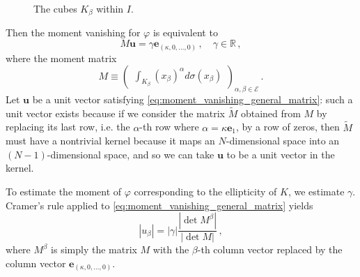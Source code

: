 \documentclass{amsart}%
\theoremstyle{plain}
\numberwithin{equation}{section}
\begin{document}
\begin{figure}[ht]\label{fig:cubes_Alpert_slant}
	\caption{The cubes $K_{\beta}$ within $I$. }
\end{figure}

 Then the moment vanishing for $\varphi$ is equivalent to 
\begin{equation}\label{eq:moment_vanishing_general_matrix}
	M \mathbf{u} = \gamma \mathbf{e}_{(\kappa, 0, \ldots, 0)} \, , \quad \gamma \in \mathbb{R} \, ,
\end{equation}
where the moment matrix
\[
	M \equiv \begin{pmatrix} \int_{K_{\beta}} \left ( x_{\beta} \right )^{\alpha} d \sigma (x_{\beta}) \end{pmatrix}_{\alpha, \beta \in \mathcal{E}}  \, .
\]
Let $\mathbf{u}$ be a unit vector satisfying \eqref{eq:moment_vanishing_general_matrix}: such a unit vector exists because if we consider the matrix $\widetilde{M}$ obtained from $M$ by replacing its last row, i.e. the $\alpha$-th row where $\alpha = \kappa \mathbf{e}_1$, by a row of zeros, then $\widetilde{M}$ must have a nontrivial kernel because it maps an $N$-dimensional space into an $(N-1)$-dimensional space, and so we can take $\mathbf{u}$ to be a unit vector in the kernel. 

To estimate the moment of $\varphi$ corresponding to the ellipticity of $K$, we estimate $\gamma$. Cramer's rule applied to \eqref{eq:moment_vanishing_general_matrix} yields
\begin{equation}\label{eq:Cramer_high_dim}
	\left | u_{\beta} \right | = \left | \gamma \right | \frac{\left | \det M^{\beta} \right | }{\left | \det M \right |} \, ,
\end{equation}
where $M^{\beta}$ is simply the matrix $M$ with the $\beta$-th column vector replaced by the column vector $\mathbf{e}_{(\kappa, 0, \ldots, 0)}$.
\end{document}
